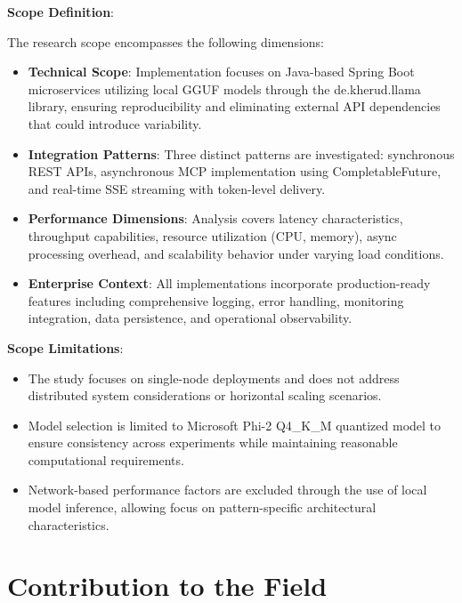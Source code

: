 \textbf{Scope Definition}:

The research scope encompasses the following dimensions:

\begin{itemize}
    \item \textbf{Technical Scope}: Implementation focuses on Java-based Spring Boot microservices utilizing local GGUF models through the de.kherud.llama library, ensuring reproducibility and eliminating external API dependencies that could introduce variability.
    
    \item \textbf{Integration Patterns}: Three distinct patterns are investigated: synchronous REST APIs, asynchronous MCP implementation using CompletableFuture, and real-time SSE streaming with token-level delivery.
    
    \item \textbf{Performance Dimensions}: Analysis covers latency characteristics, throughput capabilities, resource utilization (CPU, memory), async processing overhead, and scalability behavior under varying load conditions.
    
    \item \textbf{Enterprise Context}: All implementations incorporate production-ready features including comprehensive logging, error handling, monitoring integration, data persistence, and operational observability.
\end{itemize}

\textbf{Scope Limitations}:

\begin{itemize}
    \item The study focuses on single-node deployments and does not address distributed system considerations or horizontal scaling scenarios.
    \item Model selection is limited to Microsoft Phi-2 Q4\_K\_M quantized model to ensure consistency across experiments while maintaining reasonable computational requirements.
    \item Network-based performance factors are excluded through the use of local model inference, allowing focus on pattern-specific architectural characteristics.
\end{itemize}

\section{Contribution to the Field}

